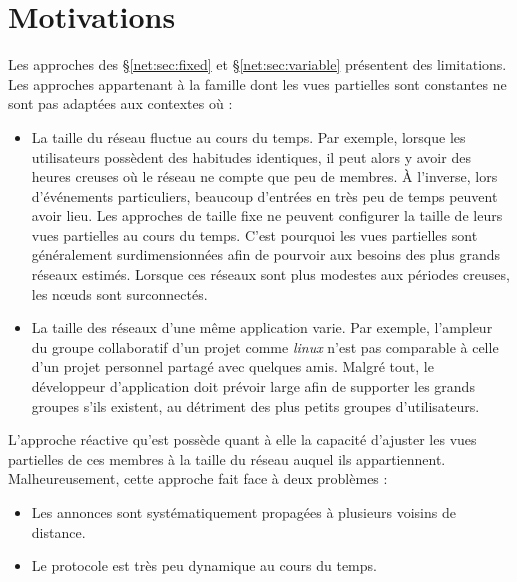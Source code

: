 
\section{Motivations}
\label{net:sec:motivations}

Les approches des §\ref{net:sec:fixed} et §\ref{net:sec:variable} présentent des
limitations. Les approches appartenant à la famille dont les vues partielles
sont constantes ne sont pas adaptées aux contextes où :
\begin{itemize}
\item La taille du réseau fluctue au cours du temps. Par exemple, lorsque les
  utilisateurs possèdent des habitudes identiques, il peut alors y avoir des
  heures creuses où le réseau ne compte que peu de membres. À l'inverse, lors
  d'événements particuliers, beaucoup d'entrées en très peu de temps peuvent
  avoir lieu.  Les approches de taille fixe ne peuvent configurer la taille de
  leurs vues partielles au cours du temps. C'est pourquoi les vues partielles
  sont généralement surdimensionnées afin de pourvoir aux besoins des plus
  grands réseaux estimés. Lorsque ces réseaux sont plus modestes aux périodes
  creuses, les nœuds sont surconnectés.
\item La taille des réseaux d'une même application varie. Par exemple, l'ampleur
  du groupe collaboratif d'un projet comme \emph{linux} n'est pas comparable à
  celle d'un projet personnel partagé avec quelques amis. Malgré tout, le
  développeur d'application doit prévoir large afin de supporter les grands
  groupes s'ils existent, au détriment des plus petits groupes d'utilisateurs.
\end{itemize}

L'approche réactive qu'est \SCAMP possède quant à elle la capacité d'ajuster les
vues partielles de ces membres à la taille du réseau auquel ils
appartiennent. Malheureusement, cette approche fait face à deux problèmes :
\begin{itemize}
\item Les annonces sont systématiquement propagées à plusieurs voisins de
  distance. 
\item Le protocole est très peu dynamique au cours du temps. 
\end{itemize}



